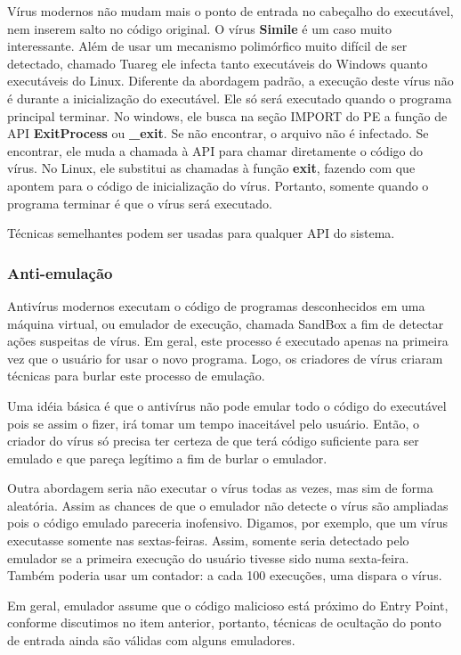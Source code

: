 Vírus modernos não mudam mais o ponto de entrada no cabeçalho do executável, nem inserem salto no código original. O vírus \textbf{Simile}\cite{symantec:2} é um caso muito interessante. Além de usar um mecanismo polimórfico muito difícil de ser detectado, chamado Tuareg\cite{szor:2} ele infecta tanto executáveis do Windows quanto executáveis do Linux. Diferente da abordagem padrão, a execução deste vírus não é durante a inicialização do executável. Ele só será executado quando o programa principal terminar. No windows, ele busca na seção IMPORT do PE a função de API \textbf{ExitProcess} ou \textbf{\_exit}. Se não encontrar, o arquivo não é infectado. Se encontrar, ele muda a chamada à API para chamar diretamente o código do vírus. No Linux, ele substitui as chamadas à função \textbf{exit}, fazendo com que apontem para o código de inicialização do vírus. Portanto, somente quando o programa terminar é que o vírus será executado.

Técnicas semelhantes podem ser usadas para qualquer API do sistema.

\subsubsection{Anti-emulação}
Antivírus modernos executam o código de programas desconhecidos em uma máquina virtual, ou emulador de execução, chamada SandBox a fim de detectar ações suspeitas de vírus. Em geral, este processo é executado apenas na primeira vez que o usuário for usar o novo programa. Logo, os criadores de vírus criaram técnicas para burlar este processo de emulação.

Uma idéia básica é que o antivírus não pode emular todo o código do executável pois se assim o fizer, irá tomar um tempo inaceitável pelo usuário. Então, o criador do vírus só precisa ter certeza de que terá código suficiente para ser emulado e que pareça legítimo a fim de burlar o emulador.

Outra abordagem seria não executar o vírus todas as vezes, mas sim de forma aleatória. Assim as chances de que o emulador não detecte o vírus são ampliadas pois o código emulado pareceria inofensivo. Digamos, por exemplo, que um vírus executasse somente nas sextas-feiras. Assim, somente seria detectado pelo emulador se a  primeira execução do usuário tivesse sido numa sexta-feira. Também poderia usar um contador: a cada 100 execuções, uma dispara o vírus.

Em geral, emulador assume que o código malicioso está próximo do Entry Point, conforme discutimos no item anterior, portanto, técnicas de ocultação do ponto de entrada ainda são válidas com alguns emuladores.

